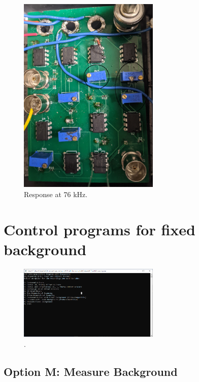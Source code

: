 \documentclass{article}
\begin{document}
\begin{figure}[!h]
	\centering
	\includegraphics[width=0.6\textwidth]{Data for Probe Writeup/circuit.jpg}
	\caption{Response at 76 kHz.}
\end{figure}

\section{Control programs for fixed background}

\par{}

\begin{figure}[!h]
	\centering
	\includegraphics[width=0.6\textwidth]{Data for Probe Writeup/Terminal at Startup.png}
	\caption{.}
\end{figure}

\subsection{Option M: Measure Background}

\par{}
\end{document}
